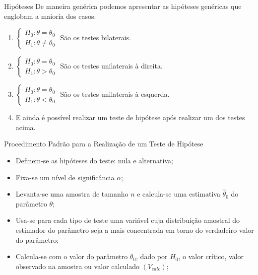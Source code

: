 \documentclass[hyperref={pdfpagelabels=false}]{beamer}
\begin{document}
\begin{frame}{Hipóteses}
De maneira genérica podemos apresentar as hipóteses genéricas que englobam a maioria dos casos: \pause
\begin{enumerate}
	\item $\begin{cases}
	H_0: \theta = \theta_0\\
	H_1: \theta \neq \theta_0
	\end{cases}$
	São os testes bilaterais. \pause
	\item $\begin{cases}
	H_0: \theta = \theta_0\\
	H_1: \theta > \theta_0
	\end{cases}$
	São os testes unilaterais à direita. \pause
	\item $\begin{cases}
	H_0: \theta = \theta_0\\
	H_1: \theta < \theta_0
	\end{cases}$
	São os testes unilaterais à esquerda. \pause
	\item E ainda é possível realizar um teste de hipótese após realizar um dos testes acima.
\end{enumerate}
\end{frame}

\begin{frame}{Procedimento Padrão para a Realização de um Teste de Hipótese}
	\begin{itemize}
		\item Definem-se as hipóteses do teste: nula e alternativa; \pause
		\item Fixa-se um nível de significância $\alpha$; \pause
		\item Levanta-se uma amostra de tamanho $n$ e calcula-se uma estimativa $\hat{\theta}_0$ do parâmetro $\theta$; \pause
		\item Usa-se para cada tipo de teste uma variável cuja distribuição amostral do estimador do parâmetro seja a mais concentrada em torno do verdadeiro valor do parâmetro; \pause
		\item Calcula-se com o valor do parâmetro $\theta_0$, dado por $H_0$, o valor crítico, valor observado na amostra ou valor calculado $(V_{calc})$; \pause
	\end{itemize}
\end{frame}
\end{document}
